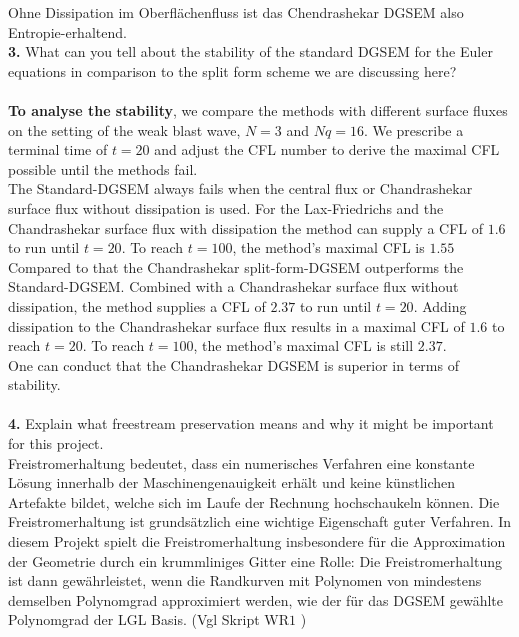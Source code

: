 \documentclass[11pt]{scrartcl}
\begin{document}
Ohne Dissipation im Oberflächenfluss ist das Chendrashekar DGSEM also Entropie-erhaltend.\\
\textbf{3.} What can you tell about the stability of the standard DGSEM for the Euler equations in comparison to the split form scheme we are discussing here? \\ \ \\
\textbf{To analyse the stability}, we compare the methods with different surface fluxes on the setting of the weak blast wave, $N=3$ and $Nq = 16$. We prescribe a terminal time of $t=20$ and adjust the CFL number to derive the maximal CFL possible until the methods fail. \\
The Standard-DGSEM always fails when the central flux or Chandrashekar surface flux without dissipation is used. For the Lax-Friedrichs and the Chandrashekar surface flux with dissipation the method can supply a CFL of $1.6$ to run until $t=20$. To reach $t=100$, the method's maximal CFL is $1.55$\\
Compared to that the Chandrashekar split-form-DGSEM outperforms the Standard-DGSEM. Combined with a Chandrashekar surface flux without dissipation, the method supplies a CFL of $2.37$ to run until $t=20$. Adding dissipation to the Chandrashekar surface flux results in a maximal CFL of $1.6$ to reach $t=20$. To reach $t=100$, the method's maximal CFL is still $2.37$. \\
One can conduct that the Chandrashekar DGSEM is superior in terms of stability.
\\ \ \\
\textbf{4.} Explain what freestream preservation means and why it might be important for this project. \\
Freistromerhaltung bedeutet, dass ein numerisches Verfahren eine konstante Lösung innerhalb der Maschinengenauigkeit erhält und keine künstlichen Artefakte bildet, welche sich im Laufe der Rechnung hochschaukeln können. Die Freistromerhaltung ist grundsätzlich eine wichtige Eigenschaft guter Verfahren. In diesem Projekt spielt die Freistromerhaltung insbesondere für die Approximation der Geometrie durch ein krummliniges Gitter eine Rolle: Die Freistromerhaltung ist dann gewährleistet, wenn die Randkurven mit Polynomen von mindestens demselben Polynomgrad approximiert werden, wie der für das DGSEM gewählte Polynomgrad der LGL Basis. (Vgl Skript WR$1$ \cite{Gassner_WR1})

\newpage
\end{document}
